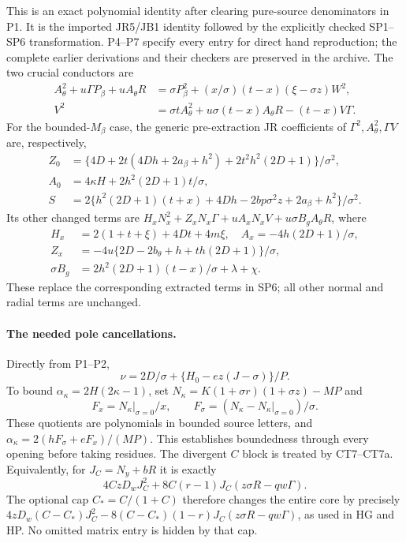 This is an exact polynomial identity after clearing pure-source
denominators in P1. It is the imported JR5/JB1 identity followed
by the explicitly checked SP1--SP6 transformation. P4--P7 specify
every entry for direct hand reproduction; the complete earlier
derivations and their checkers are preserved in the archive.
The two crucial conductors are
\[
\begin{split}
 A_\theta^2+u\Gamma P_\beta+uA_\theta R
  &=\sigma P_\beta^2+(x/\sigma)(t-x)(\xi-\sigma z)W^2,\\
 V^2&=\sigma tA_\theta^2+u\sigma(t-x)A_\theta R-(t-x)V\Gamma.
\end{split}                                                     \tag{P8}
\]
For the bounded-$M_\beta$ case, the generic pre-extraction JR
coefficients of $\Gamma^2,A_\theta^2,\Gamma V$ are, respectively,
\[
\begin{split}
 Z_0&=\{4D+2t(4Dh+2a_\beta+h^2)
                       +2t^2h^2(2D+1)\}/\sigma^2,\\
 A_0&=4\kappa H+2h^2(2D+1)t/\sigma,\\
 S&=2\{h^2(2D+1)(t+x)+4Dh-2bp\sigma^2z
                                  +2a_\beta+h^2\}/\sigma^2.
\end{split}
\]
Its other changed terms are $H_xN_x^2+Z_xN_x\Gamma+uA_xN_xV
+u\sigma B_gA_\theta R$, where
\[
\begin{split}
 H_x&=2(1+t+\xi)+4Dt+4m\xi,\quad A_x=-4h(2D+1)/\sigma,\\
 Z_x&=-4u\{2D-2b_\theta+h+th(2D+1)\}/\sigma,\\
 \sigma B_g&=2h^2(2D+1)(t-x)/\sigma+\lambda+\chi.
\end{split}
\]
These replace the corresponding extracted terms in SP6; all other
normal and radial terms are unchanged.

\paragraph{The needed pole cancellations.}
Directly from P1--P2,
\[
 \nu=2D/\sigma+\{H_0-ez(J-\sigma)\}/P.
\]
To bound $\alpha_\kappa=2H(2\kappa-1)$, set
$N_\kappa=K(1+\sigma r)(1+\sigma z)-MP$ and
\[
 F_x=N_\kappa|_{\sigma=0}/x,\qquad
 F_\sigma=(N_\kappa-N_\kappa|_{\sigma=0})/\sigma.
\]
These quotients are polynomials in bounded source letters, and
$\alpha_\kappa=2(hF_\sigma+eF_x)/(MP)$. This establishes
boundedness through every opening before taking residues.
The divergent $C$ block is treated by CT7--CT7a. Equivalently,
for $J_C=N_y+bR$ it is exactly
\[
 4CzD_wJ_C^2+8C(r-1)J_C(z\sigma R-qw\Gamma).
\]
The optional cap $C_*=C/(1+C)$ therefore changes the entire core
by precisely $4zD_w(C-C_*)J_C^2
-8(C-C_*)(1-r)J_C(z\sigma R-qw\Gamma)$, as used in HG and HP.
No omitted matrix entry is hidden by that cap.
